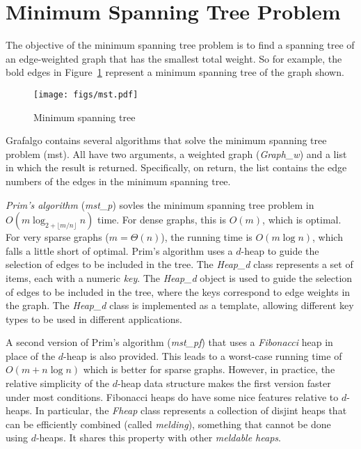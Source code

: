 \documentclass[11pt]{article}
\begin{document}
\section{Minimum Spanning Tree Problem}

The objective of the minimum spanning tree problem is to find a spanning tree
of an edge-weighted graph that has the smallest total weight. So for example, 
the bold edges in Figure~\ref{mst} represent a minimum spanning tree of
the graph shown.
\begin{figure}[h]
\centerline{\texttt{[image: figs/mst.pdf]}}
\caption{Minimum spanning tree}
\label{mst}
\end{figure}

Grafalgo contains several algorithms that solve the minimum spanning tree problem (mst).
All have two arguments, a weighted graph ({\sl Graph\_w}) and a list in which the
result is returned. Specifically, on return, the list contains the edge numbers of
the edges in the minimum spanning tree. 

{\sl Prim's algorithm} ({\sl mst\_p}) sovles the minimum spanning tree problem in
$O(m\log_{2+\lfloor m/n\rfloor} n )$ time. For dense graphs, this is $O(m)$, which is
optimal. For very sparse graphs ($m=\Theta(n)$), the running time is $O(m \log n)$,
which falls a little short of optimal.
Prim's algorithm uses a $d$-heap to guide the selection
of edges to be included in the tree. The {\sl Heap\_d} class represents a set of items,
each with a numeric {\sl key}. The {\sl Heap\_d} object is used to guide the selection of edges to be
included in the tree, where the keys correspond to edge weights in the graph. 
The {\sl Heap\_d} class is implemented
as a template, allowing different key types to be used in different applications.

A second version of Prim's algorithm ({\sl mst\_pf}) that uses a {\sl Fibonacci} heap
in place of the $d$-heap is also provided. This leads to a worst-case running time of $O(m + n \log n)$
which is better for sparse graphs. However, in practice,
the relative simplicity of the $d$-heap data structure makes the first version faster under
most conditions. Fibonacci heaps do have some nice features relative to $d$-heaps.
In particular, the {\sl Fheap} class represents a collection of disjint heaps that can be efficiently 
combined (called {\sl melding}),
something that cannot be done using $d$-heaps.
It shares this property with other {\sl meldable heaps}.
\end{document}

